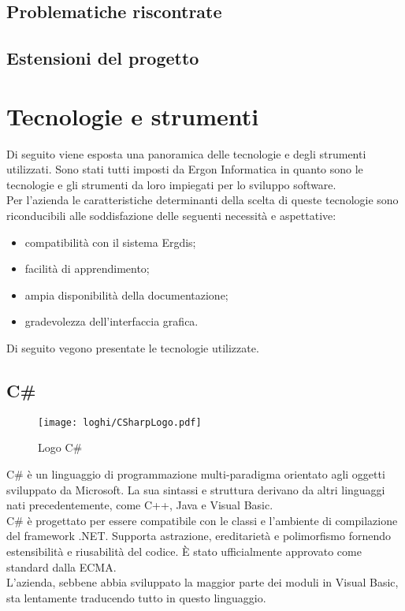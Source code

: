 \subsection{Problematiche riscontrate}
\label{sec:problematiche-riscontrate}

\subsection{Estensioni del progetto}
\label{sec:estensioni-progetto}

\newpage

\section{Tecnologie e strumenti}
\label{sec:tecnologie-strumenti}

\noindent Di seguito viene esposta una panoramica delle tecnologie e degli strumenti utilizzati.
Sono stati tutti imposti da Ergon Informatica in quanto sono le tecnologie e gli strumenti
da loro impiegati per lo sviluppo software.\\
Per l’azienda le caratteristiche determinanti della scelta di queste tecnologie
sono riconducibili alle soddisfazione delle seguenti necessità e aspettative:
\begin{itemize}
    \item compatibilità con il sistema Ergdis;
    \item facilità di apprendimento;
    \item ampia disponibilità della documentazione;
    \item gradevolezza dell’interfaccia grafica.
\end{itemize}
Di seguito vegono presentate le tecnologie utilizzate.


\subsection*{C\#}
\begin{figure}[!h] 
    \centering 
    \texttt{[image: loghi/CSharpLogo.pdf]} 
    \caption{Logo C\#}
 \end{figure}
\noindent C\# è un linguaggio di programmazione multi-paradigma orientato agli oggetti
sviluppato da Microsoft. La sua sintassi e struttura derivano da altri linguaggi nati
precedentemente, come C++, Java e Visual Basic.\\
C\# è progettato per essere compatibile con le classi e l’ambiente di compilazione
del framework .NET. Supporta astrazione, ereditarietà e polimorfismo
fornendo estensibilità e riusabilità del codice.
È stato ufficialmente approvato come standard dalla ECMA.\\
L'azienda, sebbene abbia sviluppato la maggior parte dei moduli
in Visual Basic, sta lentamente traducendo tutto in questo linguaggio.


